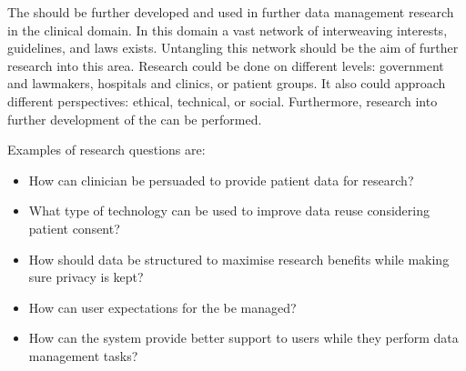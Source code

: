 The \ivfsystem{} should be further developed and used in further data management research in the clinical domain.
In this domain a vast network of interweaving interests, guidelines, and laws exists.
Untangling this network should be the aim of further research into this area.
Research could be done on different levels: government and lawmakers, hospitals and clinics, or patient groups.
It also could approach different perspectives: ethical, technical, or social.
Furthermore, research into further development of the \ivfsystem{} can be performed.

Examples of research questions are:

\begin{itemize}
	\item How can clinician be persuaded to provide patient data for research?
	\item What type of technology can be used to improve data reuse considering patient consent?
	\item How should data be structured to maximise research benefits while making sure privacy is kept?
	\item How can user expectations for the \ivfsystem{} be managed?
	\item How can the system provide better support to users while they perform data management tasks?
\end{itemize}